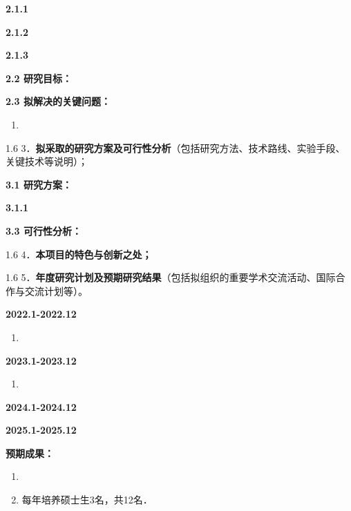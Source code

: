 \documentclass[UTF8,A4]{ctexart}
\newcommand{\blue}{\textcolor[rgb]{0.00,0.44,0.75}}
\begin{document}
\noindent\textbf{2.1.1 }



\noindent\textbf{2.1.2}


\noindent\textbf{2.1.3}


\noindent\textbf{2.2 研究目标：}


\noindent\textbf{2.3 拟解决的关键问题：}
\begin{enumerate}
  \item
\end{enumerate}
\pagebreak[4]
\begin{spacing}{1.6}
\kaishu
\blue{3．\textbf{拟采取的研究方案及可行性分析}（包括研究方法、技术路线、实验手段、关键技术等说明）；}
\end{spacing}
\noindent\textbf{3.1 研究方案：}



\noindent\textbf{3.1.1}


\noindent\textbf{3.3 可行性分析：}



\pagebreak[4]
\begin{spacing}{1.6}
\kaishu
\blue{4．\textbf{本项目的特色与创新之处；}}
\end{spacing}



\begin{spacing}{1.6}
\kaishu
\blue{5．\textbf{年度研究计划及预期研究结果}（包括拟组织的重要学术交流活动、国际合作与交流计划等）。}
\end{spacing}
\noindent\textbf{2022.1-2022.12}
\begin{enumerate}
  \item
\end{enumerate}



\noindent\textbf{2023.1-2023.12}
\begin{enumerate}
  \item
\end{enumerate}


\noindent\textbf{2024.1-2024.12}



\noindent\textbf{2025.1-2025.12}




\textbf{预期成果：}

\begin{enumerate}
  \item
  \item 每年培养硕士生3名，共12名．
\end{enumerate}
\end{document}
